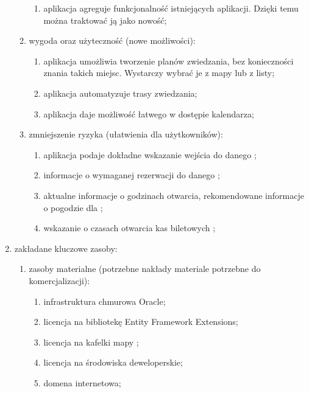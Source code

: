 \begin{enumerate}[label=\Roman*.]
\begin{enumerate}[label=\alph*.]
        \begin{enumerate}[label=\roman*.]
            \item aplikacja agreguje funkcjonalność istniejących aplikacji. Dzięki temu można traktować ją jako nowość;
        \end{enumerate}
        \item wygoda oraz użyteczność (nowe możliwości):
        \begin{enumerate}[label=\roman*.]
            \item aplikacja umożliwia tworzenie planów zwiedzania, bez konieczności znania takich miejsc. Wystarczy wybrać je z mapy lub z listy;
            \item aplikacja automatyzuje trasy zwiedzania;
            \item aplikacja daje możliwość łatwego w dostępie kalendarza;
        \end{enumerate}
        \item zmniejszenie ryzyka (ułatwienia dla użytkowników):
        \begin{enumerate}[label=\roman*.]
            \item aplikacja podaje dokładne wskazanie wejścia do danego ;
            \item informacje o wymaganej rezerwacji do danego ;
            \item aktualne informacje o godzinach otwarcia, rekomendowane informacje o pogodzie dla ;
            \item wskazanie o czasach otwarcia kas biletowych  ;
        \end{enumerate}
    \end{enumerate}
    \item zakładane kluczowe zasoby:
    \begin{enumerate}[label=\alph*.]
        \item zasoby materialne (potrzebne nakłady materiale potrzebne do komercjalizacji):
        \begin{enumerate}[label=\roman*.]
            \item infrastruktura chmurowa Oracle;
            \item licencja na bibliotekę Entity Framework Extensions;
            \item licencja na kafelki mapy ;
            \item licencja na środowiska deweloperskie;
            \item domena internetowa;

\end{enumerate}
\end{enumerate}
\end{enumerate}
